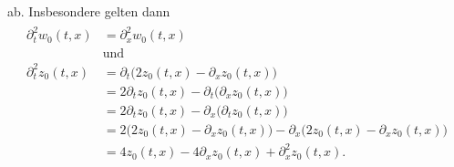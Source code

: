 ab. Insbesondere gelten dann
\begin{align}\label{eq:appendix:kleineta:korollar:h2}
\begin{split}
\partial^2_t w_0(t,x) &= \partial^2_x w_0(t,x)\qquad\\&\text{und}\\
\partial^2_t z_0(t,x) &= \partial_t \bigl( 2z_0(t,x)  - \partial_x z_0(t,x) \bigr)\\
&= 2 \partial_t z_0(t,x) - \partial_t \bigl( \partial_x z_0(t,x) \bigr)\\
&= 2 \partial_t z_0(t,x) - \partial_x \bigl( \partial_t z_0(t,x) \bigr)\\
&= 2 \bigl( 2z_0(t,x) - \partial_x z_0(t,x) \bigr) - \partial_x \bigl( 2 z_0(t,x) - \partial_x z_0(t,x) \bigr)\\
&= 4 z_0(t,x) - 4 \partial_x z_0(t,x) + \partial^2_x z_0(t,x).
\end{split}
\end{align}

